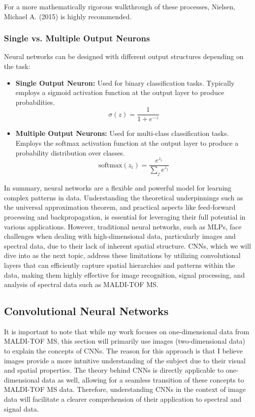 \documentclass[english,11pt,a4paper,titlepage]{article}
\begin{document}
	
	For a more mathematically rigorous walkthrough of these processes, Nielsen, Michael A. (2015) \cite{nielsenNeuralNetworksandDeepLearning2015} is highly recommended.
	
	\subsubsection*{Single vs. Multiple Output Neurons}
	Neural networks can be designed with different output structures depending on the task:
	\begin{itemize}
		\item \textbf{Single Output Neuron:} Used for binary classification tasks. Typically employs a sigmoid activation function at the output layer to produce probabilities.
		\begin{equation*}
			\sigma(z) = \frac{1}{1 + e^{-z}}
		\end{equation*}
		\item \textbf{Multiple Output Neurons:} Used for multi-class classification tasks. Employs the softmax activation function at the output layer to produce a probability distribution over classes.
		\begin{equation*}
			\text{softmax}(z_i) = \frac{e^{z_i}}{\sum_{j} e^{z_j}}
		\end{equation*}
	\end{itemize}
	
	In summary, neural networks are a flexible and powerful model for learning complex patterns in data. Understanding the theoretical underpinnings such as the universal approximation theorem, and practical aspects like feed-forward processing and backpropagation, is essential for leveraging their full potential in various applications. However, traditional neural networks, such as MLPs, face challenges when dealing with high-dimensional data, particularly images and spectral data, due to their lack of inherent spatial structure. CNNs, which we will dive into as the next topic, address these limitations by utilizing convolutional layers that can efficiently capture spatial hierarchies and patterns within the data, making them highly effective for image recognition, signal processing, and analysis of spectral data such as MALDI-TOF MS.
	
	\subsection*{Convolutional Neural Networks}
	It is important to note that while my work focuses on one-dimensional data from MALDI-TOF MS, this section will primarily use images (two-dimensional data) to explain the concepts of CNNs. The reason for this approach is that I believe images provide a more intuitive understanding of the subject due to their visual and spatial properties. The theory behind CNNs is directly applicable to one-dimensional data as well, allowing for a seamless transition of these concepts to MALDI-TOF MS data. Therefore, understanding CNNs in the context of image data will facilitate a clearer comprehension of their application to spectral and signal data.
	
\end{document}
